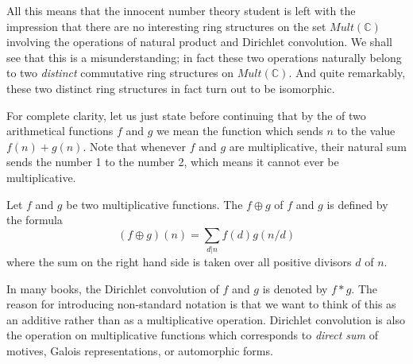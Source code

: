 \documentclass[a4paper]{article}
\begin{document}
All this means that the innocent number theory student is left with the impression that there are no interesting ring structures on the set $Mult(\mathbb{C})$ involving the operations of natural product and Dirichlet convolution. We shall see that this is a misunderstanding; in fact these two operations naturally belong to two \emph{distinct} commutative ring structures on $Mult(\mathbb{C})$. And quite remarkably, these two distinct ring structures in fact turn out to be isomorphic.

\begin{remark}
For complete clarity, let us just state before continuing that by the  of two arithmetical functions $f$ and $g$ we mean the function which sends $n$ to the value $f(n)+g(n)$. Note that whenever $f$ and $g$ are multiplicative, their natural sum sends the number 1 to the number 2, which means it cannot ever be multiplicative.
\end{remark}

\begin{definition}
Let $f$ and $g$ be two multiplicative functions. The  $f \oplus g$ of $f$ and $g$ is defined by the formula
$$ (f \oplus g)(n) =  \sum_{d \vert n} f(d) g(n/d)  $$
where the sum on the right hand side is taken over all positive divisors $d$ of $n$. 
\end{definition}
In many books, the Dirichlet convolution of $f$ and $g$ is denoted by $f * g$. The reason for introducing non-standard notation is that we want to think of this as an additive rather than as a multiplicative operation. Dirichlet convolution is also the operation on multiplicative functions which corresponds to \emph{direct sum} of motives, Galois representations, or automorphic forms.

\end{document}
